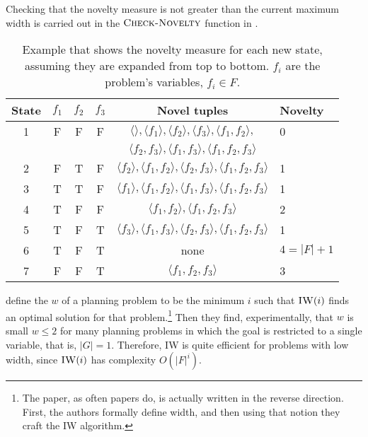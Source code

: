 Checking that the novelty measure is not greater than the current maximum width
is carried out in the $\textsc{Check-Novelty}$ function in
.

\begin{table}[hbtp]
\begin{center}
\newcommand{\tp}[1]{\langle #1 \rangle}
\begin{tabular}{c|ccc|cl}
State & $f_1$ & $f_2$ & $f_3$ & Novel tuples &  Novelty \\
  \hline
  1 & F & F & F & $\tp{},\tp{f_1},\tp{f_2},\tp{f_3},\tp{f_1,f_2},$ & 0\\
  & & & & $\tp{f_2,f_3},\tp{f_1,f_3},\tp{f_1,f_2,f_3}$ & \\
  2 & F & T & F & $\tp{f_2},\tp{f_1,f_2},\tp{f_2,f_3},\tp{f_1,f_2,f_3}$ & 1 \\
  3 & T & T & F & $\tp{f_1},\tp{f_1,f_2},\tp{f_1,f_3},\tp{f_1,f_2,f_3}$ & 1\\
  4 & T & F & F & $\tp{f_1,f_2},\tp{f_1,f_2,f_3}$ & 2\\
  5 & T & F & T & $\tp{f_3},\tp{f_1,f_3},\tp{f_2,f_3},\tp{f_1,f_2,f_3}$ & 1 \\
  6 & T & F & T & none & $4 = |F|+1$ \\
  7 & F & F & T & $\tp{f_1,f_2,f_3}$ & 3 \\
\end{tabular}

\end{center}
\caption[Novelty measure example]{Example that shows the novelty measure for
each new state, assuming they are expanded from top to
bottom. $f_i$ are the problem's variables, $f_i\in F$.}
\label{tab:novelty-example}
\end{table}

\citet{lipovetzky2012width} define the  $w$ of a planning problem
to be the minimum $i$ such that $\textsc{IW}(i)$ finds an optimal solution for
that problem.\footnote{The paper, as often papers do, is actually written in the
reverse direction. First, the authors formally define width, and then using that notion
they craft the \ac{IW} algorithm.} Then they find, experimentally, that $w$ is
small $w \leq 2$ for many planning problems in which the goal is restricted to a
single variable, that is, $|G|=1$. Therefore, \ac{IW} is quite efficient
for problems with low width, since $\textsc{IW}(i)$ has complexity $O(|F|^i)$.

